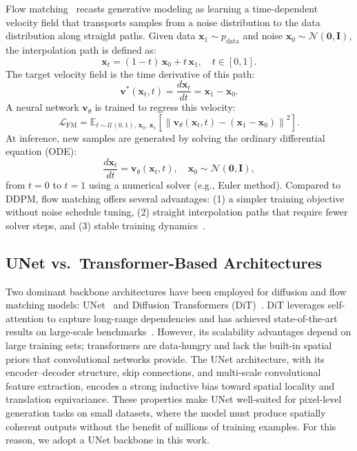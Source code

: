 \documentclass[twocolumn]{article}
\begin{document}
Flow matching~\cite{lipman2023,liu2023} recasts generative modeling as learning a time-dependent velocity field that transports samples from a noise distribution to the data distribution along straight paths. Given data $\mathbf{x}_1 \sim p_{\text{data}}$ and noise $\mathbf{x}_0 \sim \mathcal{N}(\mathbf{0}, \mathbf{I})$, the interpolation path is defined as:
\begin{equation}
    \mathbf{x}_t = (1 - t)\,\mathbf{x}_0 + t\,\mathbf{x}_1, \quad t \in [0, 1].
    \label{eq:interpolation}
\end{equation}
The target velocity field is the time derivative of this path:
\begin{equation}
    \mathbf{v}^*(\mathbf{x}_t, t) = \frac{d\mathbf{x}_t}{dt} = \mathbf{x}_1 - \mathbf{x}_0.
    \label{eq:velocity}
\end{equation}
A neural network $\mathbf{v}_\theta$ is trained to regress this velocity:
\begin{equation}
    \mathcal{L}_{\text{FM}} = \mathbb{E}_{t \sim \mathcal{U}(0,1),\, \mathbf{x}_0,\, \mathbf{x}_1}\!\left[\left\|\mathbf{v}_\theta(\mathbf{x}_t, t) - (\mathbf{x}_1 - \mathbf{x}_0)\right\|^2\right].
    \label{eq:fm_loss}
\end{equation}
At inference, new samples are generated by solving the ordinary differential equation (ODE):
\begin{equation}
    \frac{d\mathbf{x}_t}{dt} = \mathbf{v}_\theta(\mathbf{x}_t, t), \quad \mathbf{x}_0 \sim \mathcal{N}(\mathbf{0}, \mathbf{I}),
    \label{eq:ode}
\end{equation}
from $t = 0$ to $t = 1$ using a numerical solver (e.g., Euler method). Compared to DDPM, flow matching offers several advantages: (1) a simpler training objective without noise schedule tuning, (2) straight interpolation paths that require fewer solver steps, and (3) stable training dynamics~\cite{lipman2023}.

\subsection{UNet vs.\ Transformer-Based Architectures}

Two dominant backbone architectures have been employed for diffusion and flow matching models: UNet~\cite{ronneberger2015} and Diffusion Transformers (DiT)~\cite{peebles2023}. DiT leverages self-attention to capture long-range dependencies and has achieved state-of-the-art results on large-scale benchmarks~\cite{peebles2023}. However, its scalability advantages depend on large training sets; transformers are data-hungry and lack the built-in spatial priors that convolutional networks provide. The UNet architecture, with its encoder--decoder structure, skip connections, and multi-scale convolutional feature extraction, encodes a strong inductive bias toward spatial locality and translation equivariance. These properties make UNet well-suited for pixel-level generation tasks on small datasets, where the model must produce spatially coherent outputs without the benefit of millions of training examples. For this reason, we adopt a UNet backbone in this work.
\end{document}
